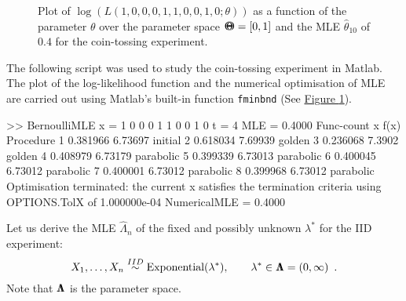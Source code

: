 {\begin{figure}[htpb]
\caption{Plot of $\log(L(1,0,0,0,1,1,0,0,1,0;\theta))$ as a function of the parameter $\theta$ over the parameter space ${\Theta}\mspace{-11 mu}{\Theta}=[0,1]$ and the MLE $\widehat{\theta}_{10}$ of $0.4$ for the coin-tossing experiment.\label {F:BernoulliMLE}}
\centering   {}
\end{figure}


\begin{labwork}\label{LW:BernoulliMLE}
The following script was used to study the coin-tossing experiment in {\sc Matlab}.  The plot of the log-likelihood function and the numerical optimisation of MLE are carried out using {\sc Matlab}'s built-in function {\tt fminbnd} (See \hyperref[F:BernoulliMLE]{Figure \ref*{F:BernoulliMLE}}).

{}

\begin{VrbM}
>> BernoulliMLE
x =     1     0     0     0     1     1     0     0     1     0
t =     4
MLE =    0.4000
Func-count     x          f(x)         Procedure
    1       0.381966      6.73697        initial
    2       0.618034      7.69939        golden
    3       0.236068       7.3902        golden
    4       0.408979      6.73179        parabolic
    5       0.399339      6.73013        parabolic
    6       0.400045      6.73012        parabolic
    7       0.400001      6.73012        parabolic
    8       0.399968      6.73012        parabolic
Optimisation terminated:
 the current x satisfies the termination criteria using OPTIONS.TolX of 1.000000e-04 
NumericalMLE =   0.4000
\end{VrbM}
\end{labwork}

\begin{example}
Let us derive the MLE $\widehat{\Lambda}_n$ of the fixed and possibly unknown $\lambda^*$ for the IID experiment:
$$X_1,\ldots,X_n \overset{IID}{\sim} \mbox{{\rm Exponential}}(\lambda^*), \qquad \lambda^* \in {\Lambda}\mspace{-11 mu}{\Lambda} = (0,\infty) \enspace .$$
Note that ${\Lambda}\mspace{-11 mu}{\Lambda}$ is the parameter space.


\end{example}}

